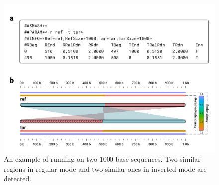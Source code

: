 \documentclass[a4paper,9pt]{extarticle}
\begin{document}
\begin{figure}[!h]
  \includegraphics[width=.95\linewidth]{fig/example.pdf}
  \caption{An example of running \smashpp on two 1000 base sequences. Two similar regions in regular mode and two similar ones in inverted mode are detected.}
  \label{fig.example}
\end{figure}

\clearpage
{}    %
\small
{}


\end{document}
